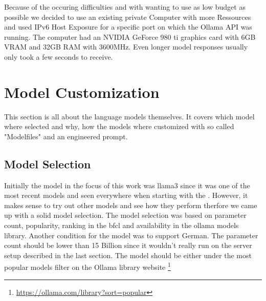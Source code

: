 Because of the occuring difficulties and with wanting to use as low budget as possible we decided to use an existing private Computer with more Ressources and used IPv6 Host Exposure for a specific port on which the Ollama API was running.
The computer had an NVIDIA GeForce 980 ti graphics card with 6GB VRAM and 32GB RAM with 3600MHz.
Even longer model responses usually only took a few seconds to receive.

\section{Model Customization}
This section is all about the language models themselves. It covers which model where selected and why, how the models where customized with so called "Modelfiles" and an engineered prompt.
\subsection{Model Selection}
Initially the model in the focus of this work was llama3 since it was one of the most recent models and seen everywhere when starting with the .
However, it makes sense to try out other models and see how they perform therfore we came up with a solid model selection.
The model selection was based on parameter count, popularity, ranking in the \gls{bfcl} and availability in the ollama models library.
Another condition for the model was to support German.
The parameter count should be lower than 15 Billion since it wouldn't really run on the server setup described in the last section.
The model should be either under the most popular models filter on the Ollama library website \footnote{\url{https://ollama.com/library?sort=popular}}

